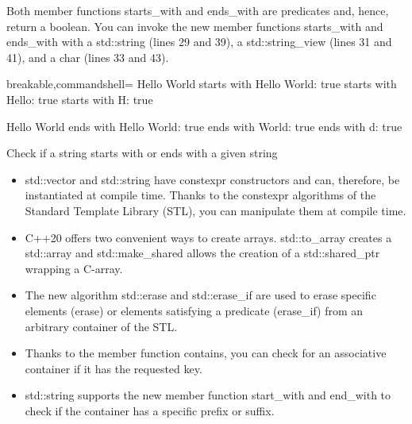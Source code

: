 Both member functions starts\_with and ends\_with are predicates and, hence, return a boolean. You can invoke the new member functions starts\_with and ends\_with with a std::string (lines 29 and 39), a std::string\_view (lines 31 and 41), and a char (lines 33 and 43).

\begin{tcblisting}{breakable,commandshell={}}
Hello World
            starts with Hello World: true
            starts with Hello: true
            starts with H: true
            
Hello World
            ends with Hello World: true
            ends with World: true
            ends with d: true
\end{tcblisting}

\begin{center}
Check if a string starts with or ends with a given string
\end{center}

\begin{tcolorbox}[breakable,enhanced jigsaw,colback=mygreen!5!white,colframe=mygreen!75!black,title={Distilled Information}]
	
\begin{itemize}
\item 
std::vector and std::string have constexpr constructors and can, therefore, be instantiated at compile time. Thanks to the constexpr algorithms of the Standard Template Library (STL), you can manipulate them at compile time.

\item 
C++20 offers two convenient ways to create arrays. std::to\_array creates a std::array and std::make\_shared allows the creation of a std::shared\_ptr wrapping a C-array.

\item 
The new algorithm std::erase and std::erase\_if are used to erase specific elements (erase) or elements satisfying a predicate (erase\_if) from an arbitrary container of the STL.

\item 
Thanks to the member function contains, you can check for an associative container if it has the requested key.

\item 
std::string supports the new member function start\_with and end\_with to check if the container has a specific prefix or suffix.
\end{itemize}
	
\end{tcolorbox}


\newpage


















